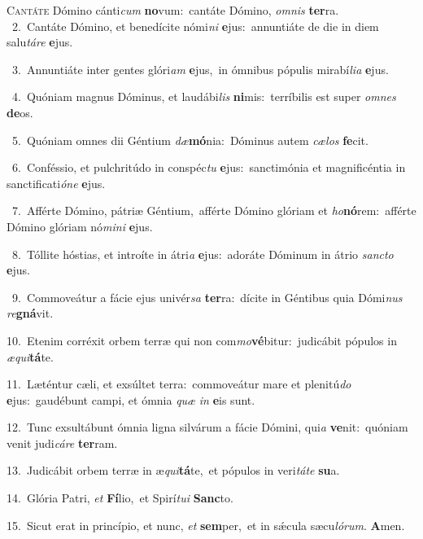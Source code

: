 \lettrine{\initial\textcolor{\initialcolor}{C}}{antáte} Dómino cánti\textit{cum} \textbf{no}\-vum:~\star cantáte Dómino, \textit{om}\-\textit{nis} \textbf{ter}\-ra.\\
{\numbfont\textcolor{\numbcolor}{~2.}}~Cantáte Dómino, et benedícite nómi\textit{ni} \textbf{e}\-jus:~\star annuntiáte de die in diem salu\-\textit{tá}\-\textit{re} \textbf{e}\-jus.\par
{\numbfont\textcolor{\numbcolor}{~3.}}~Annuntiáte inter gentes glóri\textit{am} \textbf{e}\-jus,~\star in ómnibus pópulis mirabí\-\textit{li}\-\textit{a} \textbf{e}\-jus.\par
{\numbfont\textcolor{\numbcolor}{~4.}}~Quóniam magnus Dóminus, et laudábi\textit{lis} \textbf{ni}\-mis:~\star terríbilis est super \textit{om}\-\textit{nes} \textbf{de}\-os.\par
{\numbfont\textcolor{\numbcolor}{~5.}}~Quóniam omnes dii Géntium \textit{dæ}\-\textbf{mó}nia:~\star Dóminus autem \textit{cæ}\-\textit{los} \textbf{fe}\-cit.\par
{\numbfont\textcolor{\numbcolor}{~6.}}~Conféssio, et pulchritúdo in conspéc\textit{tu} \textbf{e}\-jus:~\star sanctimónia et magnificéntia in sanctificati\-\textit{ó}\-\textit{ne} \textbf{e}\-jus.\par
{\numbfont\textcolor{\numbcolor}{~7.}}~Afférte Dómino, pátriæ Géntium,~\dagger afférte Dómino glóriam et \textit{ho}\-\textbf{nó}rem:~\star afférte Dómino glóriam nó\-\textit{mi}\-\textit{ni} \textbf{e}\-jus.\par
{\numbfont\textcolor{\numbcolor}{~8.}}~Tóllite hóstias, et introíte in átri\textit{a} \textbf{e}\-jus:~\star adoráte Dóminum in átrio \textit{sanc}\-\textit{to} \textbf{e}\-jus.\par
{\numbfont\textcolor{\numbcolor}{~9.}}~Commoveátur a fácie ejus univér\textit{sa} \textbf{ter}\-ra:~\star dícite in Géntibus quia Dómi\textit{nus} \textit{re}\-\textbf{gná}vit.\par
{\numbfont\textcolor{\numbcolor}{10.}}~Etenim corréxit orbem terræ qui non com\-\textit{mo}\-\textbf{vé}bitur:~\star judicábit pópulos in \textit{æ}\-\textit{qui}\textbf{tá}te.\par
{\numbfont\textcolor{\numbcolor}{11.}}~Læténtur cæli, et exsúltet terra:~\dagger commoveátur mare et plenitú\textit{do} \textbf{e}\-jus:~\star gaudébunt campi, et ómnia \textit{quæ} \textit{in} \textbf{e}\-is sunt.\par
{\numbfont\textcolor{\numbcolor}{12.}}~Tunc exsultábunt ómnia ligna silvárum a fácie Dómini, qui\textit{a} \textbf{ve}\-nit:~\star quóniam venit judi\-\textit{cá}\-\textit{re} \textbf{ter}\-ram.\par
{\numbfont\textcolor{\numbcolor}{13.}}~Judicábit orbem terræ in æ\-\textit{qui}\-\textbf{tá}te,~\star et pópulos in veri\-\textit{tá}\-\textit{te} \textbf{su}\-a.\par
{\numbfont\textcolor{\numbcolor}{14.}}~Glória Patri, \textit{et} \textbf{Fí}\-lio,~\star et Spirí\-\textit{tu}\-\textit{i} \textbf{Sanc}\-to.\par
{\numbfont\textcolor{\numbcolor}{15.}}~Sicut erat in princípio, et nunc, \textit{et} \textbf{sem}\-per,~\star et in sǽcula sæcu\-\textit{ló}\-\textit{rum}. \textbf{A}\-men.\par
